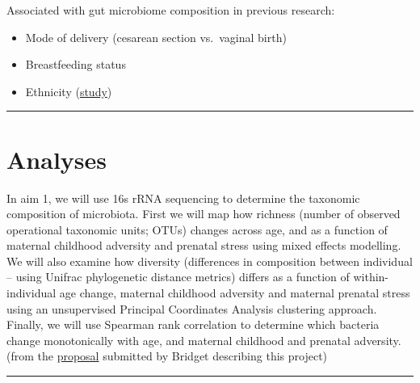 \documentclass[
]{book}
\providecommand{\tightlist}{%
  \setlength{\itemsep}{0pt}\setlength{\parskip}{0pt}}
\begin{document}
Associated with gut microbiome composition in previous research:

\begin{itemize}
\tightlist
\item
  Mode of delivery (cesarean section vs.~vaginal birth)
\item
  Breastfeeding status
\item
  Ethnicity (\href{https://www.tandfonline.com/doi/full/10.1080/19490976.2020.1756150}{study})
\end{itemize}

\begin{center}\rule{0.5\linewidth}{0.5pt}\end{center}

\hypertarget{analyses}{%
\section{Analyses}\label{analyses}}

In aim 1, we will use 16s rRNA sequencing to determine the taxonomic composition of microbiota. First we will map how richness (number of observed operational taxonomic units; OTUs) changes across age, and as a function of maternal childhood adversity and prenatal stress using mixed effects modelling. We will also examine how diversity (differences in composition between individual -- using Unifrac phylogenetic distance metrics) differs as a function of within-individual age change, maternal childhood adversity and maternal prenatal stress using an unsupervised Principal Coordinates Analysis clustering approach. Finally, we will use Spearman rank correlation to determine which bacteria change monotonically with age, and maternal childhood and prenatal adversity. (from the \href{https://ucla.app.box.com/file/740587024475}{proposal} submitted by Bridget describing this project)

\begin{center}\rule{0.5\linewidth}{0.5pt}\end{center}

  
\end{document}
